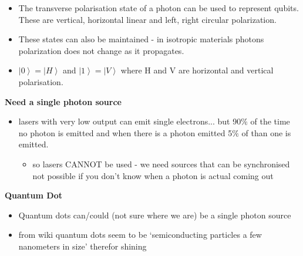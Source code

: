 \begin{itemize}
    \item The transverse polarisation state of a photon can be used to represent qubits. 
    These are vertical, horizontal linear and left, right circular polarization. \cite{bergou_quantum_2021}
    
    \item These states can also be maintained - in isotropic materials photons polarization does not change as it propagates. \cite{bergou_quantum_2021}
    
    \item $\left\vert 0 \right\rangle = \left\vert H\right\rangle $ and $\left\vert 1 \right\rangle = \left\vert V\right\rangle $ where H and V are horizontal and vertical polarisation. \cite{bergou_quantum_2021}

\end{itemize}
\vspace{1em}
{\bf Need a single photon source}
\begin{itemize}
    \item lasers with very low output can emit single electrons... but 90$\%$ of the time no photon is emitted and when there is a photon emitted 5$\%$ of than one is emitted.\cite{nielsen_quantum_2010}
    \begin{itemize}
        \item so lasers CANNOT be used - we need sources that can be synchronised not possible if you don't know when a photon is actual coming out
    \end{itemize}
\end{itemize}
\vspace{1em}

{\bf Quantum Dot}

\begin{itemize}
    \item Quantum dots can/could (not sure where we are) be a single photon source
    \item from wiki quantum dots seem to be `semiconducting particles a few nanometers in size' therefor shining
\end{itemize}

